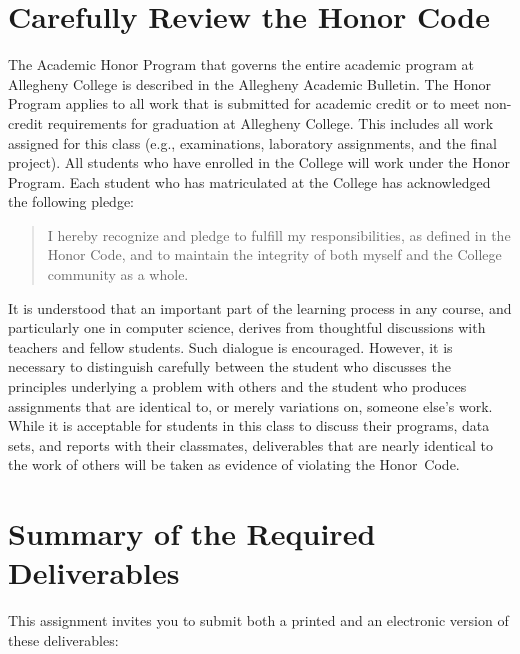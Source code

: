 \section*{Carefully Review the Honor Code}

The Academic Honor Program that governs the entire academic program at Allegheny College is described in the Allegheny
Academic Bulletin.  The Honor Program applies to all work that is submitted for academic credit or to meet non-credit
requirements for graduation at Allegheny College.  This includes all work assigned for this class (e.g., examinations,
  laboratory assignments, and the final project).  All students who have enrolled in the College will work under the Honor
Program.  Each student who has matriculated at the College has acknowledged the following pledge:

\vspace*{-.1in}
\begin{quote}
  I hereby recognize and pledge to fulfill my responsibilities, as defined in the Honor Code, and to maintain the
  integrity of both myself and the College community as a whole.
\end{quote}
\vspace*{-.1in}

\noindent It is understood that an important part of the learning process in any course, and particularly one in
computer science, derives from thoughtful discussions with teachers and fellow students.  Such dialogue is encouraged.
However, it is necessary to distinguish carefully between the student who discusses the principles underlying a problem
with others and the student who produces assignments that are identical to, or merely variations on, someone else's
work.  While it is acceptable for students in this class to discuss their programs, data sets, and reports with their
classmates, deliverables that are nearly identical to the work of others will be taken as evidence of violating the
\mbox{Honor Code}.

\section*{Summary of the Required Deliverables}

This assignment invites you to submit both a printed and an electronic version of these deliverables:


